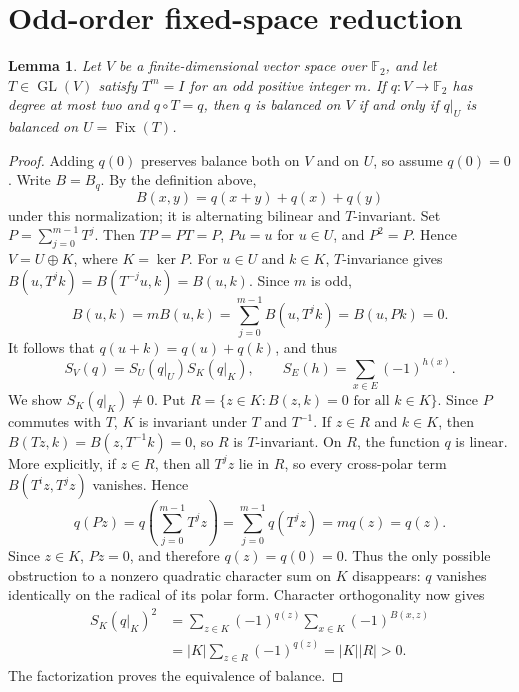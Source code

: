 \documentclass[11pt,a4paper]{article}
\newtheorem{lemma}[theorem]{Lemma}
\theoremstyle{remark}
\theoremstyle{plain}
\newcommand{\F}{\mathbb F_2}
\newcommand{\Fix}{\operatorname{Fix}}
\begin{document}
\section{Odd-order fixed-space reduction}
\begin{lemma}\label{lem:reduction}
Let $V$ be a finite-dimensional vector space over $\F$, and let $T\in\operatorname{GL}(V)$ satisfy $T^m=I$ for an odd positive integer $m$. If $q:V\to\F$ has degree at most two and $q\circ T=q$, then $q$ is balanced on $V$ if and only if $q|_U$ is balanced on $U=\Fix(T)$.
\end{lemma}
\begin{proof}
Adding $q(0)$ preserves balance both on $V$ and on $U$, so assume $q(0)=0$. Write $B=B_q$. By the definition above,
\[
B(x,y)=q(x+y)+q(x)+q(y)
\]
under this normalization; it is alternating bilinear and $T$-invariant. Set $P=\sum_{j=0}^{m-1}T^j$. Then $TP=PT=P$, $Pu=u$ for $u\in U$, and $P^2=P$. Hence $V=U\oplus K$, where $K=\ker P$. For $u\in U$ and $k\in K$, $T$-invariance gives $B(u,T^jk)=B(T^{-j}u,k)=B(u,k)$. Since $m$ is odd,
\[
B(u,k)=mB(u,k)=\sum_{j=0}^{m-1}B(u,T^jk)=B(u,Pk)=0.
\]
It follows that $q(u+k)=q(u)+q(k)$, and thus
\[S_V(q)=S_U(q|_U)S_K(q|_K),\qquad S_E(h)=\sum_{x\in E}(-1)^{h(x)}.\]
We show $S_K(q|_K)\ne0$. Put $R=\{z\in K:B(z,k)=0\text{ for all }k\in K\}$. Since $P$ commutes with $T$, $K$ is invariant under $T$ and $T^{-1}$. If $z\in R$ and $k\in K$, then $B(Tz,k)=B(z,T^{-1}k)=0$, so $R$ is $T$-invariant. On $R$, the function $q$ is linear. More explicitly, if $z\in R$, then all $T^jz$ lie in $R$, so every cross-polar term $B(T^iz,T^jz)$ vanishes. Hence
\[
q(Pz)=q\!\left(\sum_{j=0}^{m-1}T^jz\right)
     =\sum_{j=0}^{m-1}q(T^jz)
     =m q(z)=q(z).
\]
Since $z\in K$, $Pz=0$, and therefore $q(z)=q(0)=0$.
Thus the only possible obstruction to a nonzero quadratic character sum on $K$ disappears: $q$ vanishes identically on the radical of its polar form. Character orthogonality now gives
\begin{align*}
 S_K(q|_K)^2
 &=\sum_{z\in K}(-1)^{q(z)}\sum_{x\in K}(-1)^{B(x,z)}\\
 &=|K|\sum_{z\in R}(-1)^{q(z)}=|K||R|>0.
\end{align*}
The factorization proves the equivalence of balance.
\end{proof}
\end{document}
